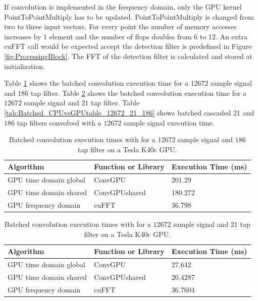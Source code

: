 If convolution is implemented in the frequency domain, only the GPU kernel PointToPointMultiply has to be updated.
PointToPointMultiply is changed from two to three input vectors.
For every point the number of memory accesses increases by $1$ element and the number of flops doubles from $6$ to $12$.
An extra cuFFT call would be expected accept the detection filter is predefined in Figure \ref{fig:ProcessingBlock}.
The FFT of the detection filter is calculated and stored at initialization.

Table \ref{tab:Batched_CPUvsGPUtable_12672_186} shows the batched convolution execution time for a $12672$ sample signal and $186$ tap filter.
Table \ref{tab:Batched_CPUvsGPUtable_12672_21} shows the batched convolution execution time for a $12672$ sample signal and $21$ tap filter.
Table \ref{tab:Batched_CPUvsGPUtable_12672_21_186} shows batched cascaded $21$ and $186$ tap filters convolved with a $12672$ sample signal execution time.
\begin{table}
\caption{Batched convolution execution times with for a $12672$ sample signal and $186$ tap filter on a Tesla K40c GPU.}
\begin{center}
\begin{tabular}{lll}
	\toprule
	Algorithm 				& Function or Library		& Execution Time (ms) \\ \midrule
	GPU time domain global 	& ConvGPU 					& 201.29		\\
	GPU time domain shared 	& ConvGPUshared 			& 180.272		\\
	GPU frequency domain 	& cuFFT						& 36.798 		\\ 
	\bottomrule
\end{tabular}
\end{center}
\label{tab:Batched_CPUvsGPUtable_12672_186}
\end{table}
\begin{table}
\caption{Batched convolution execution times with for a $12672$ sample signal and $21$ tap filter on a Tesla K40c GPU.}
\begin{center}
\begin{tabular}{lll}
	\toprule
	Algorithm 				& Function or Library		& Execution Time (ms) \\ \midrule
	GPU time domain global 	& ConvGPU 					& 27.642		\\
	GPU time domain shared 	& ConvGPUshared 			& 20.4287		\\
	GPU frequency domain 	& cuFFT						& 36.7604		\\ 
	\bottomrule
\end{tabular}
\end{center}
\label{tab:Batched_CPUvsGPUtable_12672_21}
\end{table}
